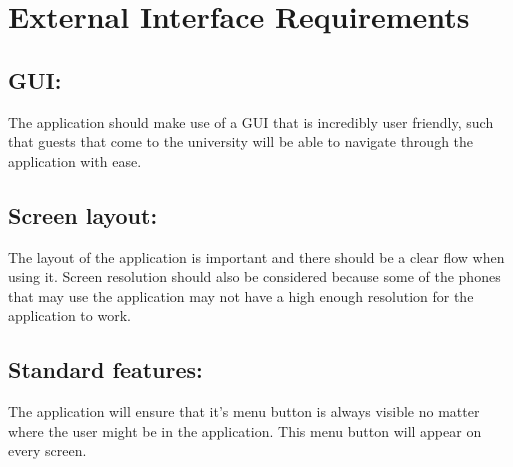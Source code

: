 \documentclass[11pt]{article}
\begin{document}
\section{External Interface Requirements}
\subsection{GUI:}
	The application should make use of a GUI that is incredibly user friendly, such that guests that come to the university will be 	able to navigate through the application with ease.
\subsection{Screen layout:}
	The layout of the application is important and there should be a clear flow when using it. Screen resolution should also be 		considered because some of the phones that may use the application may not have a high enough resolution for the application to 	work.
\subsection{Standard features:}
	The application will ensure that it's menu button is always visible no matter where the user might be in the application. This 		menu button will appear on every screen.
\end{document}
